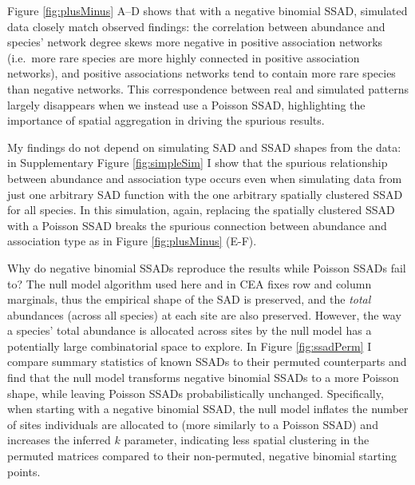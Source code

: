 \documentclass[
]{article}
\begin{document}
Figure \ref{fig:plusMinus} A--D shows that with a negative binomial
SSAD, simulated data closely match observed findings: the correlation
between abundance and species' network degree skews more negative in
positive association networks (i.e.~more rare species are more highly
connected in positive association networks), and positive associations
networks tend to contain more rare species than negative networks. This
correspondence between real and simulated patterns largely disappears
when we instead use a Poisson SSAD, highlighting the importance of
spatial aggregation in driving the spurious results.

My findings do not depend on simulating SAD and SSAD shapes from the
data: in Supplementary Figure \ref{fig:simpleSim} I show that the
spurious relationship between abundance and association type occurs even
when simulating data from just one arbitrary SAD function with the one
arbitrary spatially clustered SSAD for all species. In this simulation,
again, replacing the spatially clustered SSAD with a Poisson SSAD breaks
the spurious connection between abundance and association type as in
Figure \ref{fig:plusMinus} (E-F).

Why do negative binomial SSADs reproduce the results while Poisson SSADs
fail to? The null model algorithm used here and in CEA fixes row and
column marginals, thus the empirical shape of the SAD is preserved, and
the \emph{total} abundances (across all species) at each site are also
preserved. However, the way a species' total abundance is allocated
across sites by the null model has a potentially large combinatorial
space to explore. In Figure \ref{fig:ssadPerm} I compare summary
statistics of known SSADs to their permuted counterparts and find that
the null model transforms negative binomial SSADs to a more Poisson
shape, while leaving Poisson SSADs probabilistically unchanged.
Specifically, when starting with a negative binomial SSAD, the null
model inflates the number of sites individuals are allocated to (more
similarly to a Poisson SSAD) and increases the inferred \(k\) parameter,
indicating less spatial clustering in the permuted matrices compared to
their non-permuted, negative binomial starting points.
\end{document}
